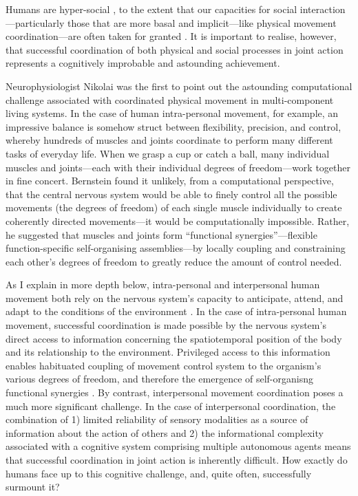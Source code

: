 \begin{CJK}{UTF8}{gbsn}
Humans are hyper-social \citep{Tomasello2012a}, to the extent that our capacities for social interaction---particularly those that are more basal and implicit---like physical movement coordination---are often taken for granted \citep{Wheatley2016}.  It is important to realise, however, that successful coordination of both physical and social processes in joint action represents a cognitively improbable and astounding achievement.

Neurophysiologist Nikolai \textcite{Bernstein1967} was the first to point out the astounding computational challenge associated with coordinated physical movement in multi-component living systems.  In the case of human intra-personal movement, for example, an impressive balance is somehow struct between flexibility, precision, and control, whereby hundreds of muscles and joints coordinate to perform many different tasks of everyday life.  When we grasp a cup or catch a ball, many individual muscles and joints---each with their individual degrees of freedom---work together in fine concert.  Bernstein found it unlikely, from a computational perspective, that the central nervous system would be able to finely control all the possible movements (the degrees of freedom) of each single muscle individually to create coherently directed movements---it would be computationally impossible.  Rather, he suggested that muscles and joints form  ``functional synergies''---flexible function-specific self-organising assemblies---by locally coupling and constraining each other’s degrees of freedom to greatly reduce the amount of control needed.

As I explain in more depth below, intra-personal and interpersonal human movement both rely on the nervous system’s capacity to anticipate, attend, and adapt to the conditions of the environment \citep{Keller2014}.  In the case of intra-personal human movement, successful coordination is made possible by the nervous system's direct access to information concerning the spatiotemporal position of the body and its relationship to the environment.  Privileged access to this information enables habituated coupling of movement control system to the organism's various degrees of freedom, and therefore the emergence of self-organisng functional synergies \citep{Riley2011}.  By contrast, interpersonal movement coordination poses a much more significant challenge.  In the case of interpersonal coordination, the combination of 1) limited reliability of sensory modalities as a source of information about the action of others \citep{Wilson2005,Wolpert2003,Frith2007} and 2) the informational complexity associated with a cognitive system comprising multiple autonomous agents \citep[each with their own movement degrees of freedom; see][]{Turvey1978} means that successful coordination in joint action is inherently difficult.  How exactly do humans face up to this cognitive challenge, and, quite often, successfully surmount it?


\end{CJK}
